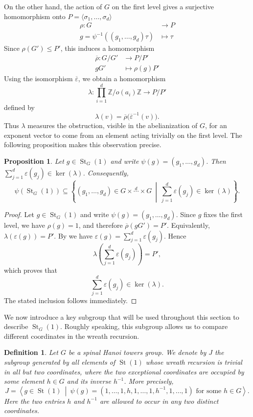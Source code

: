 \documentclass[11pt,leqno]{amsart}
\theoremstyle{plain}
\newtheorem{proposition}[proposition]{Proposition}
\newtheorem{definition}[definition]{Definition}
\DeclareMathOperator{\St}{St}
\numberwithin{equation}{section}
\begin{document}
On the other hand, the action of $G$ on the first level gives a surjective homomorphism onto $P=\langle\sigma_1,\ldots,\sigma_d\rangle$
\begin{align}\label{therhomap}
    \rho:G&\longrightarrow P\\
    g=\psi^{-1}((g_1,\ldots,g_d)\tau)&\longmapsto \tau
\end{align}
Since $\rho(G')\leq P'$, this induces a homomorphism
\begin{align*}
    \overline{\rho}:G/G'&\longrightarrow P/P'\\
    gG'&\longmapsto \rho(g)P'
\end{align*}
Using the isomorphism $\overline{\varepsilon}$, we obtain a homomorphism
\[
\lambda:
\prod_{i=1}^d \mathbb Z/o(a_i)\mathbb Z
\longrightarrow P/P'
\]
defined by
\[
\lambda(v)=\overline{\rho}\bigl(\overline{\varepsilon}^{-1}(v)\bigr).
\]
Thus $\lambda$ measures the obstruction, visible in the abelianization of $G$, for an exponent vector to come from an element acting trivially on the first level. The following proposition makes this observation precise.
\begin{proposition}\label{prop:necessary-condition-first-stabilizer}
Let $g\in \St_G(1)$ and write $\psi(g)=(g_1,\ldots,g_d)$.
Then $\sum_{j=1}^d \varepsilon(g_j)\in \ker(\lambda)$.
Consequently,
\[
\psi(\St_G(1))
\subseteq
\left\{
(g_1,\ldots,g_d)\in G\times \stackrel{d}{\cdots}\times G
\ \middle|\
\sum_{j=1}^d \varepsilon(g_j)\in \ker(\lambda)
\right\}.
\]
\end{proposition}

\begin{proof}
Let $g\in \St_G(1)$ and write $\psi(g)=(g_1,\ldots,g_d)$. Since $g$ fixes the
first level, we have $\rho(g)=1$, and therefore $\overline{\rho}(gG')=P'$. Equivalently, $\lambda(\varepsilon(g))=P'$. By  we have $\varepsilon(g)=\sum_{j=1}^d \varepsilon(g_j)$. Hence
\[
\lambda\left(\sum_{j=1}^d \varepsilon(g_j)\right)=P',
\]
which proves that
\[
\sum_{j=1}^d \varepsilon(g_j)\in \ker(\lambda).
\]
The stated inclusion follows immediately.
\end{proof}


We now introduce a key subgroup that will be used throughout this section to describe $\St_G(1)$. Roughly speaking, this subgroup allows us to compare different coordinates in the wreath recursion.
\begin{definition}\label{defofJ}
Let $G$ be a spinal Hanoi towers group. We denote by $J$ the subgroup generated by all
elements of $\St(1)$ whose wreath recursion is trivial in all but two
coordinates, where the two exceptional coordinates are occupied by some element
$h\in G$ and its inverse $h^{-1}$. More precisely,
\[
J =
\left\langle
g\in \St(1)
\ \middle|\
\psi(g)
=
(1,\ldots,1,h,1,\ldots,1,h^{-1},1,\ldots,1)
\text{ for some } h\in G
\right\rangle .
\]
Here the two entries $h$ and $h^{-1}$ are allowed to occur in any two distinct
coordinates.
\end{definition}
\end{document}
